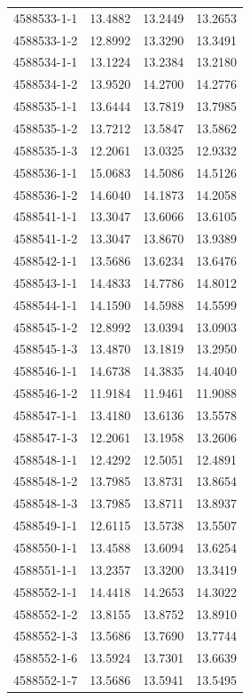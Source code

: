 \begin{longtable}{lrrr}
4588533-1-1 & 13.4882 & 13.2449 & 13.2653 \\
4588533-1-2 & 12.8992 & 13.3290 & 13.3491 \\
4588534-1-1 & 13.1224 & 13.2384 & 13.2180 \\
4588534-1-2 & 13.9520 & 14.2700 & 14.2776 \\
4588535-1-1 & 13.6444 & 13.7819 & 13.7985 \\
4588535-1-2 & 13.7212 & 13.5847 & 13.5862 \\
4588535-1-3 & 12.2061 & 13.0325 & 12.9332 \\
4588536-1-1 & 15.0683 & 14.5086 & 14.5126 \\
4588536-1-2 & 14.6040 & 14.1873 & 14.2058 \\
4588541-1-1 & 13.3047 & 13.6066 & 13.6105 \\
4588541-1-2 & 13.3047 & 13.8670 & 13.9389 \\
4588542-1-1 & 13.5686 & 13.6234 & 13.6476 \\
4588543-1-1 & 14.4833 & 14.7786 & 14.8012 \\
4588544-1-1 & 14.1590 & 14.5988 & 14.5599 \\
4588545-1-2 & 12.8992 & 13.0394 & 13.0903 \\
4588545-1-3 & 13.4870 & 13.1819 & 13.2950 \\
4588546-1-1 & 14.6738 & 14.3835 & 14.4040 \\
4588546-1-2 & 11.9184 & 11.9461 & 11.9088 \\
4588547-1-1 & 13.4180 & 13.6136 & 13.5578 \\
4588547-1-3 & 12.2061 & 13.1958 & 13.2606 \\
4588548-1-1 & 12.4292 & 12.5051 & 12.4891 \\
4588548-1-2 & 13.7985 & 13.8731 & 13.8654 \\
4588548-1-3 & 13.7985 & 13.8711 & 13.8937 \\
4588549-1-1 & 12.6115 & 13.5738 & 13.5507 \\
4588550-1-1 & 13.4588 & 13.6094 & 13.6254 \\
4588551-1-1 & 13.2357 & 13.3200 & 13.3419 \\
4588552-1-1 & 14.4418 & 14.2653 & 14.3022 \\
4588552-1-2 & 13.8155 & 13.8752 & 13.8910 \\
4588552-1-3 & 13.5686 & 13.7690 & 13.7744 \\
4588552-1-6 & 13.5924 & 13.7301 & 13.6639 \\
4588552-1-7 & 13.5686 & 13.5941 & 13.5495 \\

\end{longtable}
